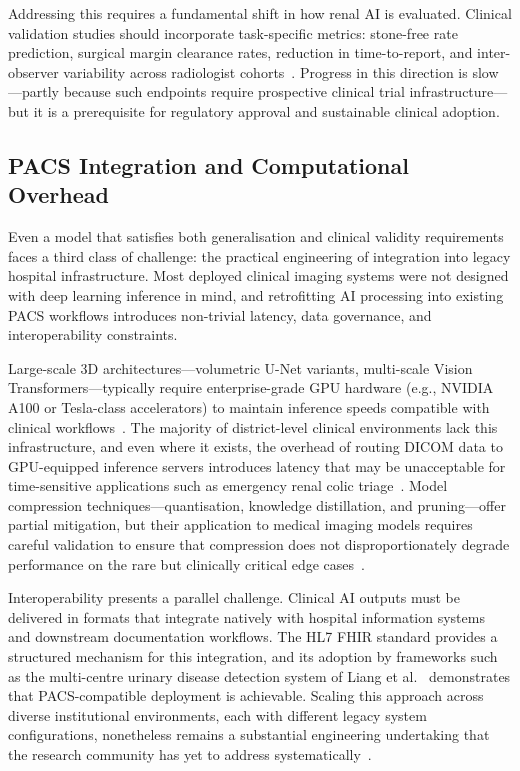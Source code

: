 \documentclass[pdflatex,sn-mathphys-num]{sn-jnl}%
\begin{document}
Addressing this requires a fundamental shift in how renal AI is evaluated. Clinical validation studies should incorporate task-specific metrics: stone-free rate prediction, surgical margin clearance rates, reduction in time-to-report, and inter-observer variability across radiologist cohorts~\cite{noorelahi2025pacs}. Progress in this direction is slow---partly because such endpoints require prospective clinical trial infrastructure---but it is a prerequisite for regulatory approval and sustainable clinical adoption.

\subsection{PACS Integration and Computational Overhead}
\label{subsec:pacs_integration}

Even a model that satisfies both generalisation and clinical validity requirements faces a third class of challenge: the practical engineering of integration into legacy hospital infrastructure. Most deployed clinical imaging systems were not designed with deep learning inference in mind, and retrofitting AI processing into existing PACS workflows introduces non-trivial latency, data governance, and interoperability constraints.

Large-scale 3D architectures---volumetric U-Net variants, multi-scale Vision Transformers---typically require enterprise-grade GPU hardware (e.g., NVIDIA A100 or Tesla-class accelerators) to maintain inference speeds compatible with clinical workflows~\cite{azad2023daeformer, li2022automatic}. The majority of district-level clinical environments lack this infrastructure, and even where it exists, the overhead of routing DICOM data to GPU-equipped inference servers introduces latency that may be unacceptable for time-sensitive applications such as emergency renal colic triage~\cite{ye2026automated}. Model compression techniques---quantisation, knowledge distillation, and pruning---offer partial mitigation, but their application to medical imaging models requires careful validation to ensure that compression does not disproportionately degrade performance on the rare but clinically critical edge cases~\cite{kadhim2024machine}.

Interoperability presents a parallel challenge. Clinical AI outputs must be delivered in formats that integrate natively with hospital information systems and downstream documentation workflows. The HL7 FHIR standard provides a structured mechanism for this integration, and its adoption by frameworks such as the multi-centre urinary disease detection system of Liang et al.~\cite{liang2025multicenter} demonstrates that PACS-compatible deployment is achievable. Scaling this approach across diverse institutional environments, each with different legacy system configurations, nonetheless remains a substantial engineering undertaking that the research community has yet to address systematically~\cite{ali2024comprehensive}.
\end{document}
